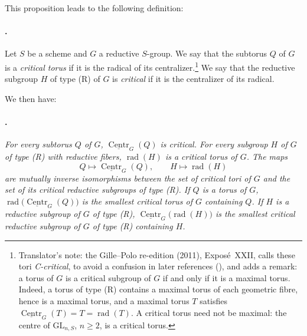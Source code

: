 This proposition leads to the following definition:

\paragraph{.}
Let \(S\) be a scheme and \(G\) a reductive \(S\)-group. We say that
the subtorus \(Q\) of \(G\) is a \emph{critical torus} if it is the
radical of its centralizer.\footnote{Translator's note: the Gille--Polo re-edition (2011), Exposé~XXII, calls these tori
\emph{C-critical}, to avoid a confusion in later references
\textup{()}, and adds a remark: a torus of \(G\) is a critical
subgroup of \(G\) if and only if it is a maximal torus. Indeed, a torus of
type \textup{(R)} contains a maximal torus of each geometric fibre, hence is a
maximal torus, and a maximal torus \(T\) satisfies
\(\underline{\operatorname{Centr}}_G(T)=T=\operatorname{rad}(T)\). A critical
torus need not be maximal: the centre of \(\mathrm{GL}_{n,S}\), \(n\geq2\), is
a critical torus.} We say that the reductive subgroup \(H\)
of type \textup{(R)} of \(G\) is \emph{critical} if it is the
centralizer of its radical.

We then have:

\paragraph{.}
{\itshape For every subtorus \(Q\) of \(G\),
\(\underline{\operatorname{Centr}}_G(Q)\) is critical. For every
subgroup \(H\) of \(G\) of type \textup{(R)} with reductive fibers,
\(\operatorname{rad}(H)\) is a critical torus of \(G\). The maps
\[
  Q\longmapsto\underline{\operatorname{Centr}}_G(Q),
  \qquad
  H\longmapsto\operatorname{rad}(H)
\]
are mutually inverse isomorphisms between the set of critical tori of
\(G\) and the set of its critical reductive subgroups of type
\textup{(R)}. If \(Q\) is a torus of \(G\),
\(\operatorname{rad}\bigl(\underline{\operatorname{Centr}}_G(Q)\bigr)\)
is the smallest critical torus of \(G\) containing \(Q\). If \(H\) is a
reductive subgroup of \(G\) of type \textup{(R)},
\(\underline{\operatorname{Centr}}_G\bigl(\operatorname{rad}(H)\bigr)\)
is the smallest critical reductive subgroup of \(G\) of type
\textup{(R)} containing \(H\).}


